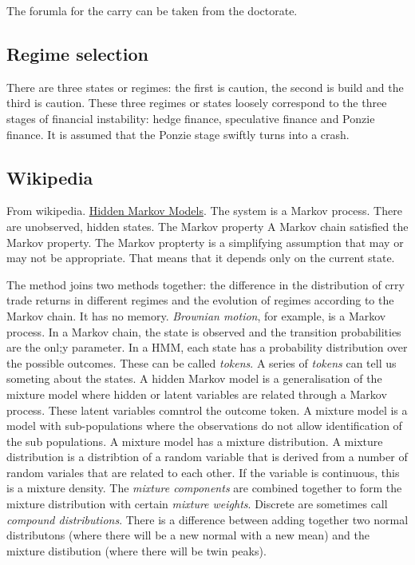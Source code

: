\documentclass[12pt, a4paper, oneside]{article} %
\begin{document}
The forumla for the carry can be taken from the doctorate. 

\subsection{Regime selection}
There are three states or regimes: the first is caution, the second is build and the third is caution. These three regimes or states loosely correspond to the three stages of financial instability: hedge finance, speculative finance and Ponzie finance. It is assumed that the Ponzie stage swiftly turns into a crash. 

\subsection{Wikipedia}
From wikipedia.  \href{http://en.wikipedia.org/wiki/Hidden_Markov_model}{Hidden Markov Models}.  The system is a Markov process.  There are unobserved, hidden states.  The Markov property A Markov chain satisfied the Markov property.  The Markov propterty is a simplifying assumption that may or may not be appropriate. That means that it depends only on the current state.  

The method joins two methods together:  the difference in the distribution of crry trade returns in different regimes and the evolution of regimes according to the Markov chain.  It has no memory. \emph{Brownian motion}, for example, is a Markov process. In a Markov chain, the state is observed and the transition probabilities are the onl;y parameter.  In a HMM, each state has a probability distribution over the possible outcomes.  These can be called \emph{tokens}.  A series of \emph{tokens} can tell us someting about the states.   A hidden Markov model is a generalisation of the mixture model where hidden or latent variables are related through a Markov process. These latent variables comntrol the outcome token. A mixture model is a model with sub-populations where the observations do not allow identification of the sub populations.  A mixture model has a mixture distribution. A mixture distribution is a distribtion of a random variable that is derived from a number of random variales that are related to each other. If the variable is continuous, this is a mixture density.  The \emph{mixture components} are combined together to form the mixture distribution with certain \emph{mixture weights}.  Discrete are sometimes call \emph{compound distributions}.  There is a difference between adding together two normal distributons (where there will be a new normal with a new mean) and the mixture distibution (where there will be twin peaks).  
\end{document}
